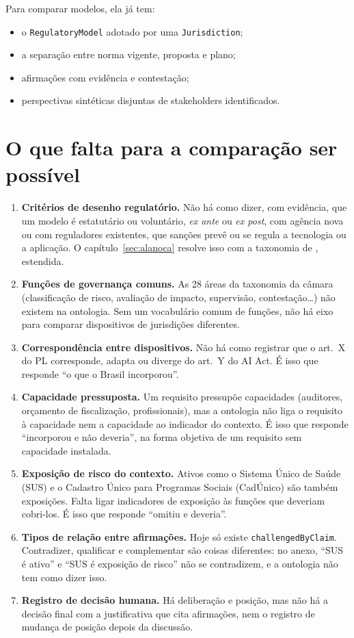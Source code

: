 \documentclass[12pt,a4paper,oneside,english,brazil]{abntex2}
\begin{document}
Para comparar modelos, ela já tem:
\begin{itemize}[leftmargin=*]
  \item o \texttt{RegulatoryModel} adotado por uma \texttt{Jurisdiction};
  \item a separação entre norma vigente, proposta e plano;
  \item afirmações com evidência e contestação;
  \item perspectivas sintéticas disjuntas de stakeholders identificados.
\end{itemize}

\section{O que falta para a comparação ser possível}\label{sec:faltas}
\begin{enumerate}[leftmargin=*]
  \item \textbf{Critérios de desenho regulatório.} Não há como dizer, com evidência, que um modelo é estatutário ou voluntário, \emph{ex ante} ou \emph{ex post}, com agência nova ou com reguladores existentes, que sanções prevê ou se regula a tecnologia ou a aplicação. O capítulo~\ref{sec:alanoca} resolve isso com a taxonomia de , estendida.
  \item \textbf{Funções de governança comuns.} As 28 áreas da taxonomia da câmara (classificação de risco, avaliação de impacto, supervisão, contestação\ldots) não existem na ontologia. Sem um vocabulário comum de funções, não há eixo para comparar dispositivos de jurisdições diferentes.
  \item \textbf{Correspondência entre dispositivos.} Não há como registrar que o art.~X do PL corresponde, adapta ou diverge do art.~Y do AI Act. É isso que responde ``o que o Brasil incorporou''.
  \item \textbf{Capacidade pressuposta.} Um requisito pressupõe capacidades (auditores, orçamento de fiscalização, profissionais), mas a ontologia não liga o requisito à capacidade nem a capacidade ao indicador do contexto. É isso que responde ``incorporou e não deveria'', na forma objetiva de um requisito sem capacidade instalada.
  \item \textbf{Exposição de risco do contexto.} Ativos como o Sistema Único de Saúde (SUS) e o Cadastro Único para Programas Sociais (CadÚnico) são também exposições. Falta ligar indicadores de exposição às funções que deveriam cobri-los. É isso que responde ``omitiu e deveria''.
  \item \textbf{Tipos de relação entre afirmações.} Hoje só existe \texttt{challengedByClaim}. Contradizer, qualificar e complementar são coisas diferentes: no anexo, ``SUS é ativo'' e ``SUS é exposição de risco'' não se contradizem, e a ontologia não tem como dizer isso.
  \item \textbf{Registro de decisão humana.} Há deliberação e posição, mas não há a decisão final com a justificativa que cita afirmações, nem o registro de mudança de posição depois da discussão.
\end{enumerate}
\end{document}
